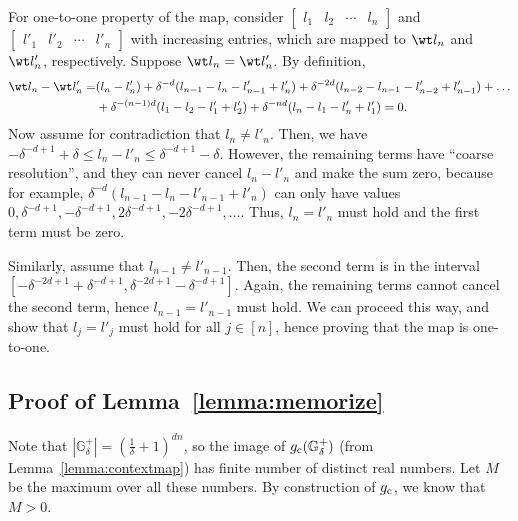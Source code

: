 \documentclass{article} %
\def\sG{{\mathbb{G}}}
\begin{document}
For one-to-one property of the map, consider $\begin{bmatrix} l_1 & l_2 & \cdots & l_n \end{bmatrix}$ and $\begin{bmatrix} l'_1 & l'_2 & \cdots & l'_n \end{bmatrix}$ with increasing entries, which are mapped to $\wt l_n$ and $\wt l'_n$, respectively.
Suppose $\wt l_n = \wt l'_n$. By definition,
\begin{align*}
    \wt l_n - \wt l'_n
    =& (l_n - l'_n) + \delta^{-d} (l_{n-1} - l_n - l'_{n-1} + l'_n) 
    + \delta^{-2d} (l_{n-2} - l_{n-1} - l'_{n-2} + l'_{n-1}) + \dots
    \\&+ \delta^{-(n-1)d}(l_1-l_2-l'_1+l'_2) + \delta^{-nd} (l_n-l_1-l'_n+l'_1) = 0.
\end{align*}
Now assume for contradiction that $l_n \neq l'_n$. Then, we have $-\delta^{-d+1}+\delta \leq l_n - l'_n \leq \delta^{-d+1}-\delta$. However, the remaining terms have ``coarse resolution'', and they can never cancel $l_n - l'_n$ and make the sum zero, because for example, $\delta^{-d} (l_{n-1} - l_n - l'_{n-1} + l'_n)$ can only have values $0, \delta^{-d+1}, -\delta^{-d+1}, 2\delta^{-d+1}, -2\delta^{-d+1}, \dots$. Thus, $l_n = l'_n$ must hold and the first term must be zero.

Similarly, assume that $l_{n-1} \neq l'_{n-1}$. Then, the second term is in the interval $[-\delta^{-2d+1}+\delta^{-d+1}, \delta^{-2d+1}-\delta^{-d+1}]$.
Again, the remaining terms cannot cancel the second term, hence $l_{n-1} = l'_{n-1}$ must hold.
We can proceed this way, and show that $l_j = l'_j$ must hold for all $j \in [n]$, hence proving that the map is one-to-one.



\subsection{Proof of Lemma~\ref{lemma:memorize}}
Note that $|\sG^+_{\delta}| = (\frac{1}{\delta}+1)^{dn}$, so the image of $g_{\rm c}(\sG^+_{\delta})$ (from Lemma~\ref{lemma:contextmap}) has finite number of distinct real numbers. Let $M$ be the maximum over all these numbers. By construction of $g_{\rm c}$, we know that $M>0$.
\end{document}
